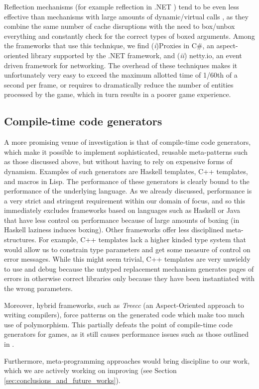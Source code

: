 Reflection mechanisms (for example reflection in .NET \cite{richter2012clr}) tend to be even less effective than mechanisms with large amounts of dynamic/virtual calls , as they combine the same number of cache disruptions with the need to box/unbox everything and constantly check for the correct types of boxed arguments. Among the frameworks that use this technique, we find (\textit{i})Proxies in C\#, an aspect-oriented library supported by the .NET framework, and (\textit{ii}) netty.io, an event driven framework for networking. The overhead of these techniques makes it unfortunately very easy to exceed the maximum allotted time of 1/60th of a second per frame, or requires to dramatically reduce the number of entities processed by the game, which in turn results in a poorer game experience.


\subsection{Compile-time code generators}

A more promising venue of investigation is that of compile-time code generators, which make it possible to implement sophisticated, reusable meta-patterns such as those discussed above, but without having to rely on expensive forms of dynamism. Examples of such generators are Haskell templates, C++ templates, and macros in Lisp. The performance of these generators is clearly bound to the performance of the underlying language. As we already discussed, performance is a very strict and stringent requirement within our domain of focus, and so this immediately excludes frameworks based on languages such as Haskell or Java that have less control on performance because of large amounts of boxing (in Haskell laziness induces boxing). Other frameworks offer less disciplined meta-structures. For example, C++ templates lack a higher kinded type system that would allow us to constrain type parameters and get some measure of control on error messages. While this might seem trivial, C++ templates are very unwieldy to use and debug because the untyped replacement mechanism generates pages of errors in otherwise correct libraries only because they have been instantiated with the wrong parameters.

Moreover, hybrid frameworks, such as \textit{Treecc} (an Aspect-Oriented approach to writing compilers), force patterns on the generated code which make too much use of polymorphism. This partially defeats the point of compile-time code generators for games, as it still causes performance issues such as those outlined in \cite{ungar1992object}.

Furthermore, meta-programming approaches would bring discipline to our work, which we are actively working on improving (see Section \ref{sec:conclusions_and_future_works}).